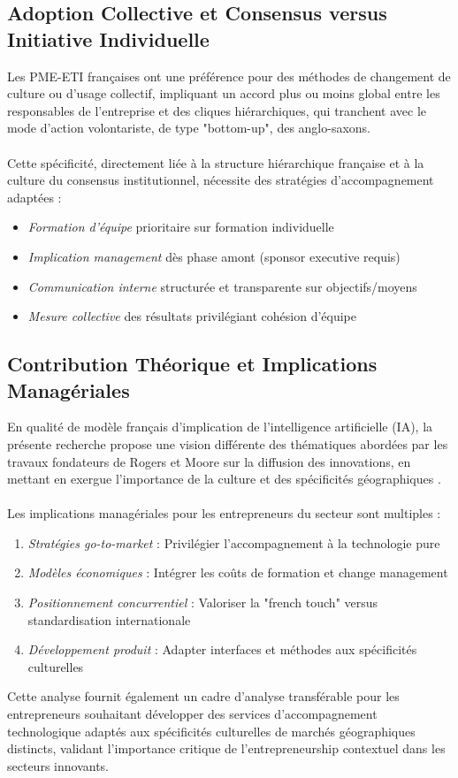 \subsection{Adoption Collective et Consensus versus Initiative Individuelle}

Les PME-ETI françaises ont une préférence pour des méthodes de changement de culture ou d’usage collectif, impliquant un accord plus ou moins global entre les responsables de l’entreprise et des cliques hiérarchiques, qui tranchent avec le mode d’action volontariste, de type "bottom-up", des anglo-saxons.
\\\\
Cette spécificité, directement liée à la structure hiérarchique française et à la culture du consensus institutionnel, nécessite des stratégies d'accompagnement adaptées :
\begin{itemize}
    \item \emph{Formation d'équipe} prioritaire sur formation individuelle
    \item \emph{Implication management} dès phase amont (sponsor executive requis)  
    \item \emph{Communication interne} structurée et transparente sur objectifs/moyens
    \item \emph{Mesure collective} des résultats privilégiant cohésion d'équipe
\end{itemize}

\subsection{Contribution Théorique et Implications Managériales}

En qualité de modèle français d'implication de l'intelligence artificielle (IA), la présente recherche propose une vision différente des thématiques abordées par les travaux fondateurs de Rogers et Moore sur la diffusion des innovations, en mettant en exergue l'importance de la culture et des spécificités géographiques \cite{rogers2003diffusion,moore2014crossing}.
\\\\
Les implications managériales pour les entrepreneurs du secteur sont multiples :
\begin{enumerate}
    \item \emph{Stratégies go-to-market} : Privilégier l'accompagnement à la technologie pure
    \item \emph{Modèles économiques} : Intégrer les coûts de formation et change management  
    \item \emph{Positionnement concurrentiel} : Valoriser la "french touch" versus standardisation internationale
    \item \emph{Développement produit} : Adapter interfaces et méthodes aux spécificités culturelles
\end{enumerate}

Cette analyse fournit également un cadre d'analyse transférable pour les entrepreneurs souhaitant développer des services d'accompagnement technologique adaptés aux spécificités culturelles de marchés géographiques distincts, validant l'importance critique de l'entrepreneurship contextuel dans les secteurs innovants.
